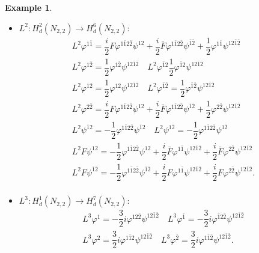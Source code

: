\documentclass[a4paper, 11pt]{amsart}
\theoremstyle{plain}
\theoremstyle{definition}
\newtheorem{esempio}{Example}[section]
\numberwithin{equation}{section}
\begin{document}
\begin{esempio}
\begin{itemize}
\begin{gather*}
        \end{gather*}
        \item $L^{2}: H^{2}_{d}(N_{2,2}) \rightarrow H^{6}_{d}(N_{2,2})$:
        \begin{gather*}
            L^{2}\varphi^{1\bar1} = \dfrac{i}{2}F\varphi^{1\bar12\bar2}\psi^{12} + \dfrac{i}{2}\bar F\varphi^{1\bar12\bar2}\psi^{\bar1\bar2} + \dfrac{1}{2}\varphi^{1\bar1}\psi^{12\bar1\bar2}\\
            L^{2}\varphi^{1\bar2} = \dfrac{1}{2}\varphi^{1\bar2}\psi^{12\bar1\bar2} \quad 
            L^{2}\varphi^{\bar1 2} \dfrac{1}{2}\varphi^{\bar1 2}\psi^{12\bar1\bar2} \\
            L^{2}\varphi^{1 2} = \dfrac{1}{2}\varphi^{1 2}\psi^{12\bar1\bar2} \quad
            L^{2}\varphi^{\bar1\bar2} = \dfrac{1}{2}\varphi^{\bar1 \bar2}\psi^{12\bar1\bar2} \\
            L^{2}\varphi^{2\bar2} = \dfrac{i}{2}F\varphi^{1\bar12\bar2}\psi^{12} + \dfrac{i}{2}\bar F\varphi^{1\bar12\bar2}\psi^{\bar1\bar2} + \dfrac{1}{2}\varphi^{2\bar2}\psi^{12\bar1\bar2} \\
            L^{2}\psi^{\bar1 2} = -\dfrac{1}{2}\varphi^{1\bar12\bar2}\psi^{\bar1 2}\quad
            L^{2}\psi^{1 \bar2} = -\dfrac{1}{2}\varphi^{1\bar12\bar2}\psi^{1 \bar2}  \\
            L^{2}F\psi^{1 2} =  -\dfrac{1}{2}\varphi^{1\bar12\bar2}\psi^{1 2} + \dfrac{i}{2}\bar F \varphi^{1\bar1}\psi^{12\bar1\bar2} + \dfrac{i}{2}\bar F \varphi^{2\bar2}\psi^{12\bar1\bar2}\\
            L^{2}F\psi^{\bar1\bar2} = -\dfrac{1}{2}\varphi^{1\bar12\bar2}\psi^{\bar1\bar2} + \dfrac{i}{2}F \varphi^{1\bar1}\psi^{12\bar1\bar2} + \dfrac{i}{2}F \varphi^{2\bar2}\psi^{12\bar1\bar2}. \\
        \end{gather*}
        \item $L^{3}: H^{1}_{d}(N_{2,2}) \rightarrow H^{7}_{d}(N_{2,2})$:
        \begin{gather*}
            L^{3}\varphi^{1} = -\dfrac{3}{2}i\varphi^{12\bar2}\psi^{12\bar1\bar2}
            \quad  L^{3}\varphi^{\bar1} = -\dfrac{3}{2}i\varphi^{\bar1 2\bar2}\psi^{12\bar1\bar2}\\
            L^{3}\varphi^{2} = \dfrac{3}{2}i\varphi^{1\bar1 2}\psi^{12\bar1\bar2}
            \quad  L^{3}\varphi^{\bar2} = \dfrac{3}{2}i\varphi^{1\bar1 \bar2}\psi^{12\bar1\bar2}. \\
        \end{gather*}
    \end{itemize}
    
\end{esempio}
\end{document}
